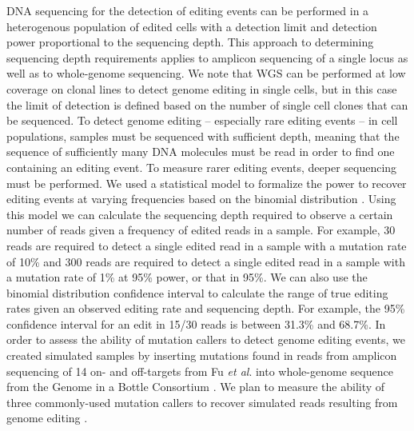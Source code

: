 \documentclass[a4paper, titlepage, openright]{book}
\begin{document}
DNA sequencing for the detection of editing events can be performed in a heterogenous population of edited cells with a detection limit and detection power proportional to the sequencing depth. This approach to determining sequencing depth requirements applies to amplicon sequencing of a single locus as well as to whole-genome sequencing. We note that WGS can be performed at low coverage on clonal lines to detect genome editing in single cells, but in this case the limit of detection is defined based on the number of single cell clones that can be sequenced. To detect genome editing – especially rare editing events – in cell populations, samples must be sequenced with sufficient depth, meaning that the sequence of sufficiently many DNA molecules must be read in order to find one containing an editing event. To measure rarer editing events, deeper sequencing must be performed. We used a statistical model to formalize the power to recover editing events at varying frequencies based on the binomial distribution \citep{petrackova2019standardization}. Using this model we can calculate the sequencing depth required to observe a certain number of reads given a frequency of edited reads in a sample. For example, 30 reads are required to detect a single edited read in a sample with a mutation rate of 10\% and 300 reads are required to detect a single edited read in a sample with a mutation rate of 1\% at 95\% power, or that in 95\%. We can also use the binomial distribution confidence interval to calculate the range of true editing rates given an observed editing rate and sequencing depth. For example, the 95\% confidence interval for an edit in 15/30 reads is between 31.3\% and 68.7\%. In order to assess the ability of mutation callers to detect genome editing events, we created simulated samples by inserting mutations found in reads from amplicon sequencing of 14 on- and off-targets from Fu \emph{et al}. \citep{fu2014improving} into whole-genome sequence from the Genome in a Bottle Consortium \citep{zook2016extensive}. We plan to measure the ability of three commonly-used mutation callers to recover simulated reads resulting from genome editing \citep{mckenna2010genome, kim2018strelka2, koboldt2012varscan}.
\end{document}
